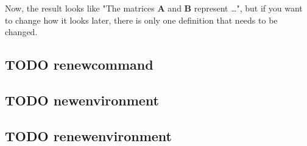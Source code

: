 \documentclass[11pt]{article}
\newcommand{\mat}[1]{\mathbf{#1}}
\begin{document}
Now, the result looks like "The matrices $\mat{A}$ and $\mat{B}$
represent \ldots{}", but if you want to change how it looks later, there is
only one definition that needs to be changed.

\subsection{{\bfseries\sffamily TODO} renewcommand}
\label{sec-4-4}

\subsection{{\bfseries\sffamily TODO} newenvironment}
\label{sec-4-5}

\subsection{{\bfseries\sffamily TODO} renewenvironment}
\label{sec-4-6}
\end{document}
